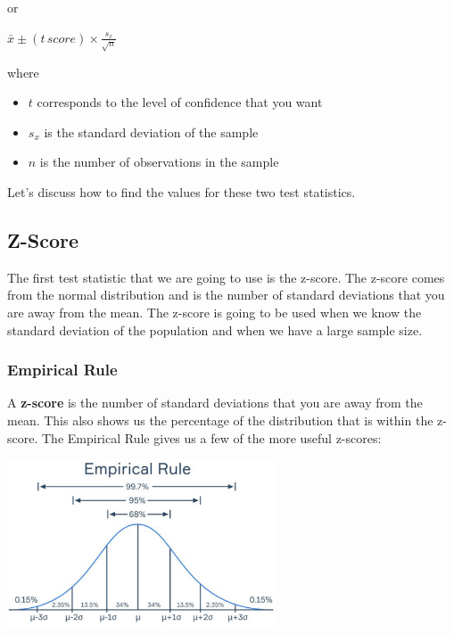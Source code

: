 \documentclass[
  letterpaper,
  DIV=11,
  numbers=noendperiod]{scrreprt}
\providecommand{\tightlist}{%
  \setlength{\itemsep}{0pt}\setlength{\parskip}{0pt}}\usepackage{longtable,booktabs,array}
\begin{document}
or

\(\displaystyle{\bar{x} \pm (t \, score) \times \frac{s_x}{\sqrt{n}}}\)

where

\begin{itemize}
\tightlist
\item
  \(t\) corresponds to the level of confidence that you want
\item
  \(s_x\) is the standard deviation of the sample
\item
  \(n\) is the number of observations in the sample
\end{itemize}

Let's discuss how to find the values for these two test statistics.

\subsection*{Z-Score}\label{z-score}

The first test statistic that we are going to use is the z-score. The
z-score comes from the normal distribution and is the number of standard
deviations that you are away from the mean. The z-score is going to be
used when we know the standard deviation of the population and when we
have a large sample size.

\subsubsection*{Empirical Rule}\label{empirical-rule}

A \textbf{z-score} is the number of standard deviations that you are
away from the mean. This also shows us the percentage of the
distribution that is within the z-score. The Empirical Rule gives us a
few of the more useful z-scores:

\includegraphics[width=0.6\textwidth,height=\textheight]{./images/EPCI_1.jpg}
\end{document}
